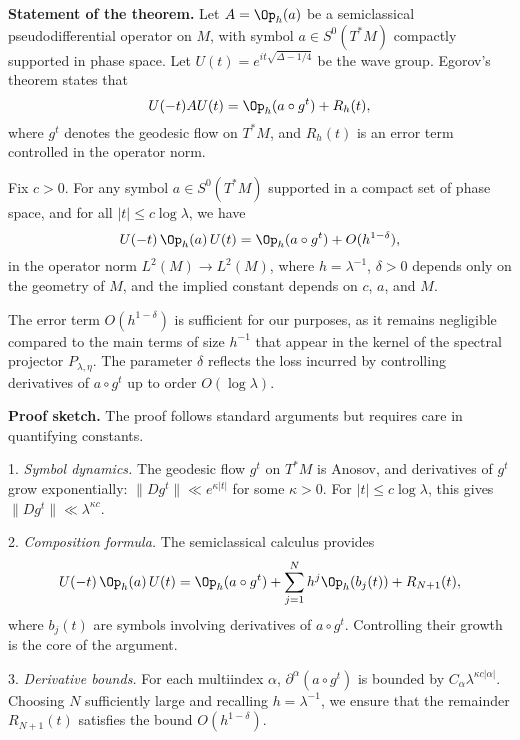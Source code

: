 \medskip

\textbf{Statement of the theorem.} Let $A = \Op_h(a)$ be a semiclassical pseudodifferential operator on $M$, with symbol $a \in S^0(T^*M)$ compactly supported in phase space. Let $U(t) = e^{it\sqrt{\Delta-1/4}}$ be the wave group. Egorov’s theorem states that
\[
U(-t) A U(t) = \Op_h(a \circ g^t) + R_h(t),
\]
where $g^t$ denotes the geodesic flow on $T^*M$, and $R_h(t)$ is an error term controlled in the operator norm.

\begin{theorem}\label{thm:egorov}
Fix $c > 0$. For any symbol $a \in S^0(T^*M)$ supported in a compact set of phase space, and for all $|t| \leq c \log \lambda$, we have
\[
U(-t)\, \Op_h(a)\, U(t) = \Op_h(a \circ g^t) + O(h^{1-\delta}),
\]
in the operator norm $L^2(M) \to L^2(M)$, where $h = \lambda^{-1}$, $\delta > 0$ depends only on the geometry of $M$, and the implied constant depends on $c$, $a$, and $M$.
\end{theorem}

\begin{remark}
The error term $O(h^{1-\delta})$ is sufficient for our purposes, as it remains negligible compared to the main terms of size $h^{-1}$ that appear in the kernel of the spectral projector $P_{\lambda,\eta}$. The parameter $\delta$ reflects the loss incurred by controlling derivatives of $a \circ g^t$ up to order $O(\log \lambda)$.
\end{remark}

\medskip

\textbf{Proof sketch.} The proof follows standard arguments but requires care in quantifying constants.

1. \emph{Symbol dynamics.} The geodesic flow $g^t$ on $T^*M$ is Anosov, and derivatives of $g^t$ grow exponentially: $\| D g^t \| \ll e^{\kappa |t|}$ for some $\kappa > 0$. For $|t| \leq c \log \lambda$, this gives $\| D g^t \| \ll \lambda^{\kappa c}$.

2. \emph{Composition formula.} The semiclassical calculus provides
\[
U(-t)\, \Op_h(a)\, U(t) = \Op_h(a \circ g^t) + \sum_{j=1}^{N} h^j \Op_h(b_j(t)) + R_{N+1}(t),
\]
where $b_j(t)$ are symbols involving derivatives of $a \circ g^t$. Controlling their growth is the core of the argument.

3. \emph{Derivative bounds.} For each multiindex $\alpha$, $\partial^\alpha (a \circ g^t)$ is bounded by $C_\alpha \lambda^{\kappa c |\alpha|}$. Choosing $N$ sufficiently large and recalling $h = \lambda^{-1}$, we ensure that the remainder $R_{N+1}(t)$ satisfies the bound $O(h^{1-\delta})$.

